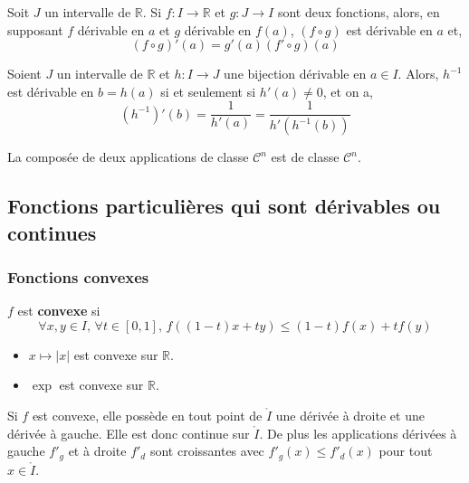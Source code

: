   \begin{proposition}
    Soit $J$ un intervalle de $\mathbb{R}$. Si $f : I \rightarrow \mathbb{R}$ et $g : J \rightarrow I$ sont deux fonctions, alors, en supposant $f$ dérivable en $a$ et $g$ dérivable en $f(a)$, $(f \circ g)$ est dérivable en $a$ et,
    \[ (f \circ g)'(a) = g'(a) (f' \circ g)(a) \]
  \end{proposition}

  \begin{corollary}
    Soient $J$ un intervalle de $\mathbb{R}$ et $h : I \rightarrow J$ une bijection dérivable en $a \in I$. Alors, $h^{-1}$ est dérivable en $b = h(a)$ si et seulement si $h'(a) \neq 0$, et on a,
    \[ (h^{-1})'(b) = \frac{1}{h'(a)} = \frac{1}{h'(h^{-1}(b))} \]
  \end{corollary}

  \begin{corollary}
    La composée de deux applications de classe $\mathcal{C}^n$ est de classe $\mathcal{C}^n$.
  \end{corollary}

  \subsection{Fonctions particulières qui sont dérivables ou continues}

  \subsubsection{Fonctions convexes}


  \begin{definition}
    $f$ est \textbf{convexe} si
    \[ \forall x, y \in I, \, \forall t \in [0,1], \, f((1-t)x + ty) \leq (1-t)f(x) + tf(y) \]
  \end{definition}

  \begin{example}
    \begin{itemize}
      \item $x \mapsto \vert x \vert$ est convexe sur $\mathbb{R}$.
      \item $\exp$ est convexe sur $\mathbb{R}$.
    \end{itemize}
  \end{example}


  \begin{proposition}
    Si $f$ est convexe, elle possède en tout point de $\mathring{I}$ une dérivée à droite et une dérivée à gauche. Elle est donc continue sur $\mathring{I}$. De plus les applications dérivées à gauche $f'_g$ et à droite $f'_d$ sont croissantes avec $f'_g(x) \leq f'_d(x)$ pour tout $x \in \mathring{I}$.
  \end{proposition}

